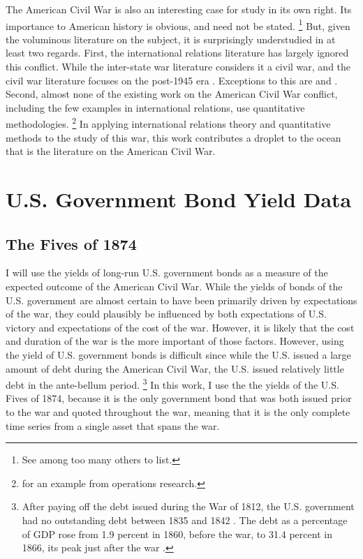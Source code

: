 The American Civil War is also an interesting case for study in its own right.
Its importance to American history is obvious, and need not be stated.%
\footnote{See \textcite{McPherson2003} among too many others to list.}
But, given the voluminous literature on the subject, it is surprisingly understudied in at least two regards. %
First, the international relations literature has largely ignored this conflict.
While the inter-state war literature considers it a civil war, and the civil war literature focuses on the post-1945 era \parencites[140-141]{Reiter2009}[2]{Poast2012}. %
Exceptions to this are \textcite{Reiter2009} and \textcite{Poast2012}.
Second, almost none of the existing work on the American Civil War conflict, including the few examples in international relations, use quantitative methodologies. %
\footnote{\textcite{Weiss1966} for an example from operations research.}
In applying international relations theory and quantitative methods to the study of this war, this work contributes a droplet to the ocean that is the literature on the American Civil War.



\section{U.S. Government Bond Yield Data}
\label{sec:why-prices-study}



\subsection{The Fives of 1874}
\label{sec:5s-1874}

I will use the yields of long-run U.S. government bonds as a measure of the expected outcome of the American Civil War.
While the yields of bonds of the U.S. government are almost certain to have been primarily driven by expectations of the war, they could plausibly be influenced by both expectations of U.S. victory and expectations of the cost of the war.
However, it is likely that the cost and duration of the war is the more important of those factors.
However, using the yield of U.S. government bonds is difficult since while the U.S. issued a large amount of debt during the American Civil War, the U.S. issued relatively little debt in the ante-bellum period.%
\footnote{
  After paying off the debt issued during the War of 1812, the U.S. government had no outstanding debt between 1835 and 1842 \parencite[297]{HomerSylla2005}.
  The debt as a percentage of GDP rose from 1.9 percent in 1860, before the war, to 31.4 percent in 1866, its peak just after the war \parencites{CBO2012}{CBO2012a}.
}
In this work, I use the the yields of the U.S. Fives of 1874, because it is the only government bond that was both issued prior to the war and quoted throughout the war, meaning that it is the only complete time series from a single asset that spans the war.

